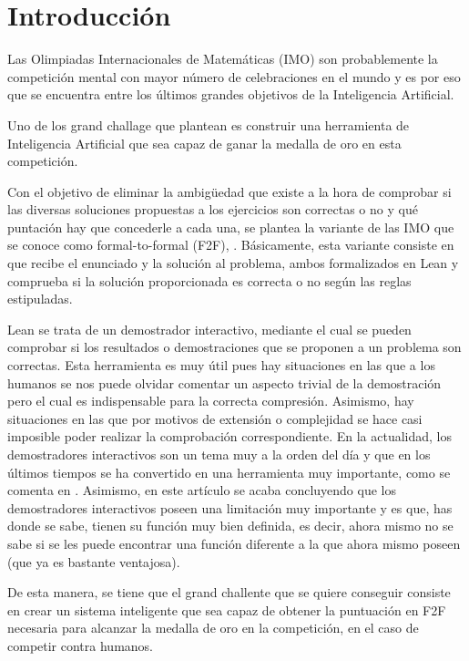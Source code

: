 \chapter*{Introducción}

Las Olimpiadas Internacionales de Matemáticas (IMO) son probablemente la
competición mental con mayor número de celebraciones en el mundo y es por eso
que se encuentra entre los últimos grandes objetivos de la Inteligencia
Artificial.

Uno de los grand challage que plantean es construir una herramienta de
Inteligencia Artificial que sea capaz de ganar la medalla de oro en esta
competición.

Con el objetivo de eliminar la ambigüedad que existe a la hora de comprobar si
las diversas soluciones propuestas a los ejercicios son correctas o no y qué
puntación hay que concederle a cada una, se plantea la variante de las IMO
que se conoce como formal-to-formal (F2F), \cite{challenge}. Básicamente, esta
variante consiste en que recibe el enunciado y la solución al problema, ambos
formalizados en Lean y comprueba si la solución proporcionada es correcta o no
según las reglas estipuladas.

Lean se trata de un demostrador interactivo, mediante el cual se pueden
comprobar si los resultados o demostraciones que se proponen a un problema son
correctas. Esta herramienta es muy útil pues hay situaciones en las que a los
humanos se nos puede olvidar comentar un aspecto trivial de la demostración
pero el cual es indispensable para la correcta compresión. Asimismo, hay
situaciones en las que por motivos de extensión o complejidad se hace casi
imposible poder realizar la comprobación correspondiente. En la actualidad, los
demostradores interactivos son un tema muy a la orden del día y que en los
últimos tiempos se ha convertido en una herramienta muy importante, como
se comenta en \cite{ART2}. Asimismo, en este artículo se acaba concluyendo que
los demostradores interactivos poseen una limitación muy importante y es que,
has donde se sabe, tienen su función muy bien definida, es decir, ahora mismo
no se sabe si se les puede encontrar una función diferente a la que ahora mismo
poseen (que ya es bastante ventajosa).

De esta manera, se tiene que el grand challente que se quiere conseguir consiste
en crear un sistema inteligente que sea capaz de obtener la puntuación en F2F
necesaria para alcanzar la medalla de oro en la competición, en el caso de
competir contra humanos.

